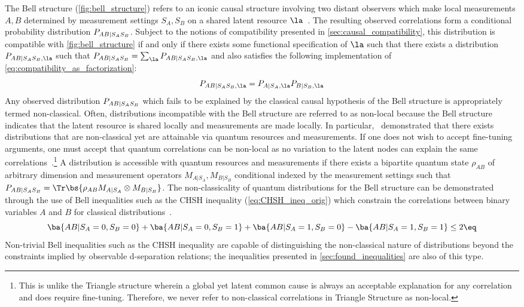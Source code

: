 \documentclass[aps, 10pt, english, twoside, pra, nofootinbib, tightenlines, longbibliography, superscriptaddress]{revtex4-1}
\begin{document}
    The Bell structure (\cref{fig:bell_structure}) refers to an iconic causal structure involving two distant observers which make local measurements $A, B$ determined by measurement settings $S_A, S_B$ on a shared latent resource $\la$~\cite{Brunner_2013}. The resulting observed correlations form a conditional probability distribution $\prob[AB|S_AS_B]$. Subject to the notions of compatibility presented in \cref{sec:causal_compatibility}, this distribution is compatible with \cref{fig:bell_structure} if and only if there exists some functional specification of $\la$ such that there exists a distribution $\prob[AB|S_AS_B,\la]$ such that $\prob[AB|S_AS_B] = \sum_{\la} \prob[AB|S_AS_B,\la]$ and also satisfies the following implementation of \cref{eq:compatibility_as_factorization}:
    \[ \prob[AB|S_AS_B,\la] = \prob[A|S_A,\la]\prob[B|S_B,\la] \]
    Any observed distribution $\prob[AB|S_AS_B]$ which fails to be explained by the classical causal hypothesis of the Bell structure is appropriately termed non-classical. Often, distributions incompatible with the Bell structure are referred to as non-local because the Bell structure indicates that the latent resource is shared locally and measurements are made locally. In particular,~\citet{Bell_1964} demonstrated that there exists distributions that are non-classical yet are attainable via quantum resources and measurements. If one does not wish to accept fine-tuning arguments, one must accept that quantum correlations can be non-local as no variation to the latent nodes can explain the same correlations~\cite{Wood_2012}.\footnote{This is unlike the Triangle structure wherein a global yet latent common cause is always an acceptable explanation for any correlation and does require fine-tuning. Therefore, we never refer to non-classical correlations in Triangle Structure as non-local.} A distribution is accessible with quantum resources and measurements if there exists a bipartite quantum state $\rho_{AB}$ of arbitrary dimension and measurement operators $M_{A|S_A}, M_{B|S_B}$ conditional indexed by the measurement settings such that $\prob[AB|S_AS_B] = \Tr\bs{\rho_{AB}M_{A|S_A}\otimes M_{B|S_B}}$. The non-classicality of quantum distributions for the Bell structure can be demonstrated through the use of Bell inequalities such as the CHSH inequality (\cref{eq:CHSH_ineq_orig}) which constrain the correlations between binary variables $A$ and $B$ for classical distributions~\cite{CHSH_Original}.
    \[ \ba{\p A\p B | S_{\p{A}} = 0, S_{\p{B}} = 0} + \ba{\p A\p B | S_{\p{A}} = 0, S_{\p{B}} = 1} + \ba{\p A\p B | S_{\p{A}} = 1, S_{\p{B}} = 0} - \ba{\p A\p B | S_{\p{A}} = 1, S_{\p{B}} = 1} \leq 2 \eq \label{eq:CHSH_ineq_orig} \]
    Non-trivial Bell inequalities such as the CHSH inequality are capable of distinguishing the non-classical nature of distributions beyond the constraints implied by observable d-separation relations; the inequalities presented in \cref{sec:found_inequalities} are also of this type.
\end{document}
